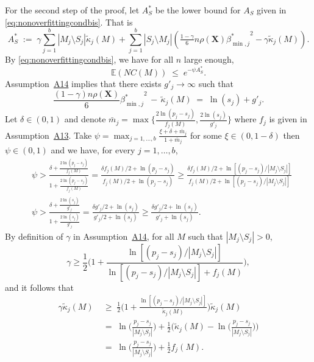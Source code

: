 \documentclass[bj,authoryear]{imsart}
\theoremstyle{plain}
\newcommand{\E}{\mathbb{E}}
\newcommand{\bs}{\boldsymbol}
\begin{document}
For the second step of the proof, let $A_S^*$ be the lower bound for $A_S$ given in \eqref{eq:nonoverfittingcondbis}. That is 
$$A_S^*\;:=\;\gamma\sum_{j=1}^b|M_j \setminus S_j|\tilde{\kappa}_j(M) + \sum_{j=1}^b |S_j\setminus M_j |\left(\tfrac{1-\gamma}{6} n \rho(\bs X) {\beta^*_{\min,j}}^{2} - \gamma\tilde{\kappa}_j(M)\right).$$
By \eqref{eq:nonoverfittingcondbis}, we have for all $n$ large enough,
\begin{equation}\label{eq:boundexpbis}
    \E(NC(M))\;\leq\;e^{-\psi A_S^*}.
\end{equation}
Assumption~\hyperlink{lab:A14}{A14} implies that there exists $g'_j \to \infty$ such that
\begin{equation}\label{eq:ogbeabis}
    \frac{(1-\gamma) n\rho(\bs X)}{6}{\beta_{\min,j}^*}^2 \,- \,\tilde{\kappa}_j(M) \;=\; \ln(s_j) + g'_{j}.
\end{equation}
Let $\delta \in (0,1)$ and denote $\bar{m}_j=\max\big\{\frac{2\ln(p_j-s_j)}{f_j(M)},\frac{2\ln(s_j)}{g'_{j}}\big\}$ where $f_j$ is given in Assumption~\hyperlink{lab:A13}{A13}. 
Take $\psi=\max_{j=1,\ldots,b}\frac{\xi + \delta + \bar{m}_j}{1+\bar{m}_j}$ for some $\xi \in(0, 1- \delta)$ then $\psi \in (0,1)$ and we have, for every $j=1,\ldots,b$,
\begin{align}
    &\psi > \frac{\delta + \frac{2\ln(p_j-s_j)}{f_j(M)}}{1+\frac{2\ln(p_j-s_j)}{f_j(M)}} = \frac{\delta f_j(M)/2 + \ln(p_j-s_j)}{f_j(M)/2 +\ln(p_j-s_j)} \geq \frac{\delta f_j(M)/2 + \ln[(p_j-s_j)/|M_j\setminus S_j|]}{f_j(M)/2 +\ln[(p_j-s_j)/|M_j\setminus S_j|]}\label{eq:psifbis}\\
    &\psi > \frac{\delta + \frac{2\ln(s_j)}{g'_j}}{1+\frac{2\ln(s_j)}{g'_j}} = \frac{\delta g'_j/2 + \ln(s_j)}{g'_j/2 +\ln(s_j)} \geq \frac{\delta g'_j/2 + \ln(s_j)}{g'_j +\ln(s_j)}.\label{eq:psigbis}
\end{align}
By definition of $\gamma$ in Assumption~\hyperlink{lab:A14}{A14}, for all $M$ such that $|M_j\setminus S_j|>0$, $$\gamma \geq \frac12\Bigg(1+ \frac{\ln[(p_j-s_j)/|M_j\setminus S_j|]}{\ln[(p_j-s_j)/|M_j\setminus S_j|] + f_j(M)}\Bigg),$$ and it follows that 
\begin{align*}
    \gamma\tilde{\kappa}_j(M)
    &\;\geq\;\frac12 \Big(1+\frac{\ln[(p_j-s_j)/|M_j\setminus S_j|]}{\tilde{\kappa}_j(M)}\Big)\tilde{\kappa}_j(M)\\
    &\;=\;\ln\Big(\frac{p_j-s_j}{|M_j\setminus S_j|}\Big)+\frac12\Big(\tilde{\kappa}_j(M)-\ln\Big(\frac{p_j-s_j}{|M_j\setminus S_j|}\Big)\Big)\\
    & \;=\; \ln\Big(\frac{p_j-s_j}{|M_j\setminus S_j|}\Big)+ \frac12f_j(M).
\end{align*}
\end{document}
